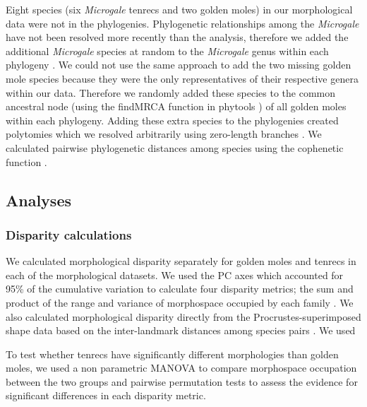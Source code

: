 \documentclass[12pt,a4paper]{article}
\begin{document}
	Eight species (six \textit{Microgale} tenrecs and two golden moles) in our morphological data were not in the phylogenies. Phylogenetic relationships among the \textit{Microgale} have not been resolved more recently than the \citep{Kuhn2011} analysis, therefore we added the additional \textit{Microgale} species at random to the \textit{Microgale} genus within each phylogeny \citep{Revell2012}. We could not use the same approach to add the two missing golden mole species because they were the only representatives of their respective genera within our data. Therefore we randomly added these species to the common ancestral node (using the findMRCA function in phytools \citep{Revell2012}) of all golden moles within each phylogeny. Adding these extra species to the phylogenies created polytomies which we resolved arbitrarily using zero-length branches \citep{Paradis2004}. We calculated pairwise phylogenetic distances among species using the cophenetic function \citep[R Development Core][]{Team2013}. 
	
\subsection{Analyses}
\subsubsection{Disparity calculations} 

	We calculated morphological disparity separately for golden moles and tenrecs in each of the morphological datasets. We used the PC axes which accounted for 95\% of the cumulative variation to calculate four disparity metrics; the sum and product of the range and variance of morphospace occupied by each family \citep{Brusatte2008, Foth2012, Ruta2013}. We also calculated morphological disparity directly from the Procrustes-superimposed shape data based on the inter-landmark distances among species pairs \citep[ZelditchMD,][]{Zelditch2012}. We used 

	To test whether tenrecs have significantly different morphologies than golden moles, we used a non parametric MANOVA \citep{Anderson2001} to compare morphospace occupation between the two groups and pairwise permutation tests to assess the evidence for significant differences in each disparity metric.
\end{document}
